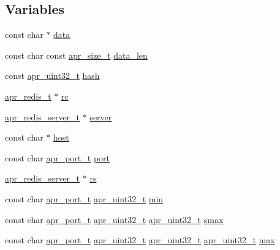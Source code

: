 \subsection*{Variables}
\begin{DoxyCompactItemize}
\item 
const char $\ast$ \hyperlink{group__APR__Util__RC_ga8f64897c7ccc5c13f276d1d07c4e7095}{data}
\item 
const char const \hyperlink{group__apr__platform_gaaa72b2253f6f3032cefea5712a27540e}{apr\+\_\+size\+\_\+t} \hyperlink{group__APR__Util__RC_ga371e964d98d4000f4bc080fa4ad81902}{data\+\_\+len}
\item 
const \hyperlink{group__apr__platform_ga558548a135d8a816c4787250744ea147}{apr\+\_\+uint32\+\_\+t} \hyperlink{group__APR__Util__RC_gaf86d4a5b21e961280c272d79aacf26ca}{hash}
\item 
\hyperlink{structapr__redis__t}{apr\+\_\+redis\+\_\+t} $\ast$ \hyperlink{group__APR__Util__RC_ga38828c1c35a96d3d86edce1458ba991f}{rc}
\item 
\hyperlink{structapr__redis__server__t}{apr\+\_\+redis\+\_\+server\+\_\+t} $\ast$ \hyperlink{group__APR__Util__RC_ga48a1618bc9e57e0406979ef034512520}{server}
\item 
const char $\ast$ \hyperlink{group__APR__Util__RC_gae032e164f1daa754d6fbb79d59723931}{host}
\item 
const char \hyperlink{group__apr__network__io_gaa670a71960f6eb4fe0d0de2a1e7aba03}{apr\+\_\+port\+\_\+t} \hyperlink{group__APR__Util__RC_ga225c76c246a5cc263c5a2628eb99353e}{port}
\item 
\hyperlink{structapr__redis__server__t}{apr\+\_\+redis\+\_\+server\+\_\+t} $\ast$ \hyperlink{group__APR__Util__RC_ga2f1b060c750d4f17eb602a451b6e4edc}{rs}
\item 
const char \hyperlink{group__apr__network__io_gaa670a71960f6eb4fe0d0de2a1e7aba03}{apr\+\_\+port\+\_\+t} \hyperlink{group__apr__platform_ga558548a135d8a816c4787250744ea147}{apr\+\_\+uint32\+\_\+t} \hyperlink{group__APR__Util__RC_gaed1ae724c786d088e40b9e6667e4e039}{min}
\item 
const char \hyperlink{group__apr__network__io_gaa670a71960f6eb4fe0d0de2a1e7aba03}{apr\+\_\+port\+\_\+t} \hyperlink{group__apr__platform_ga558548a135d8a816c4787250744ea147}{apr\+\_\+uint32\+\_\+t} \hyperlink{group__apr__platform_ga558548a135d8a816c4787250744ea147}{apr\+\_\+uint32\+\_\+t} \hyperlink{group__APR__Util__RC_ga5645303505286909d95c228588952953}{smax}
\item 
const char \hyperlink{group__apr__network__io_gaa670a71960f6eb4fe0d0de2a1e7aba03}{apr\+\_\+port\+\_\+t} \hyperlink{group__apr__platform_ga558548a135d8a816c4787250744ea147}{apr\+\_\+uint32\+\_\+t} \hyperlink{group__apr__platform_ga558548a135d8a816c4787250744ea147}{apr\+\_\+uint32\+\_\+t} \hyperlink{group__apr__platform_ga558548a135d8a816c4787250744ea147}{apr\+\_\+uint32\+\_\+t} \hyperlink{group__APR__Util__RC_ga38e7d1fc94ad8c6709d5b2243d2fd94b}{max}

\end{DoxyCompactItemize}
